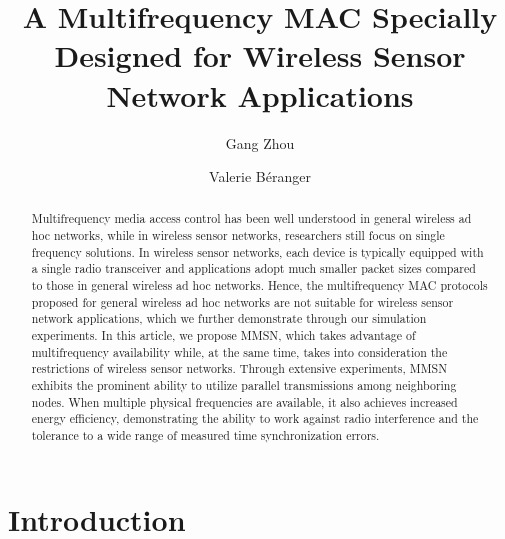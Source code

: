 \documentclass[acmtog, authorversion]{acmart}
\begin{document}
\title{A Multifrequency MAC Specially Designed for Wireless Sensor
  Network Applications}

\author{Gang Zhou}
\author{Valerie B\'eranger}

\begin{abstract}
Multifrequency media access control has been well understood in
general wireless ad hoc networks, while in wireless sensor networks,
researchers still focus on single frequency solutions. In wireless
sensor networks, each device is typically equipped with a single
radio transceiver and applications adopt much smaller packet sizes
compared to those in general wireless ad hoc networks. Hence, the
multifrequency MAC protocols proposed for general wireless ad hoc
networks are not suitable for wireless sensor network applications,
which we further demonstrate through our simulation experiments. In
this article, we propose MMSN, which takes advantage of
multifrequency availability while, at the same time, takes into
consideration the restrictions of wireless sensor networks. Through
extensive experiments, MMSN exhibits the prominent ability to utilize
parallel transmissions among neighboring nodes. When multiple physical
frequencies are available, it also achieves increased energy
efficiency, demonstrating the ability to work against radio
interference and the tolerance to a wide range of measured time
synchronization errors.
\end{abstract}

\maketitle

\section{Introduction}
\end{document}
